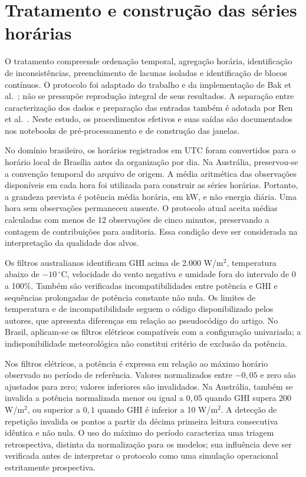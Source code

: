 \section{Tratamento e construção das séries horárias}
\label{sec:tratamento_bases}

O tratamento compreende ordenação temporal, agregação horária, identificação de inconsistências, preenchimento de lacunas isoladas e identificação de blocos contínuos. O protocolo foi adaptado do trabalho e da implementação de Bak et al.\ \cite{bak2025transfer}; não se pressupõe reprodução integral de seus resultados. A separação entre caracterização dos dados e preparação das entradas também é adotada por Ren et al.\ \cite{ren2024dctcn}. Neste estudo, os procedimentos efetivos e suas saídas são documentados nos notebooks de pré-processamento e de construção das janelas.

No domínio brasileiro, os horários registrados em UTC foram convertidos para o horário local de Brasília antes da organização por dia. Na Austrália, preservou-se a convenção temporal do arquivo de origem. A média aritmética das observações disponíveis em cada hora foi utilizada para construir as séries horárias. Portanto, a grandeza prevista é potência média horária, em kW, e não energia diária. Uma hora sem observações permaneceu ausente. O protocolo atual aceita médias calculadas com menos de 12 observações de cinco minutos, preservando a contagem de contribuições para auditoria. Essa condição deve ser considerada na interpretação da qualidade dos alvos.

Os filtros australianos identificam GHI acima de 2.000 W/m$^2$, temperatura abaixo de $-10\,^\circ$C, velocidade do vento negativa e umidade fora do intervalo de 0 a 100\%. Também são verificadas incompatibilidades entre potência e GHI e sequências prolongadas de potência constante não nula. Os limites de temperatura e de incompatibilidade seguem o código disponibilizado pelos autores, que apresenta diferenças em relação ao pseudocódigo do artigo. No Brasil, aplicam-se os filtros elétricos compatíveis com a configuração univariada; a indisponibilidade meteorológica não constitui critério de exclusão da potência.

Nos filtros elétricos, a potência é expressa em relação ao máximo horário observado no período de referência. Valores normalizados entre $-0{,}05$ e zero são ajustados para zero; valores inferiores são invalidados. Na Austrália, também se invalida a potência normalizada menor ou igual a $0{,}05$ quando GHI supera 200 W/m$^2$, ou superior a $0{,}1$ quando GHI é inferior a 10 W/m$^2$. A detecção de repetição invalida os pontos a partir da décima primeira leitura consecutiva idêntica e não nula. O uso do máximo do período caracteriza uma triagem retrospectiva, distinta da normalização para os modelos; sua influência deve ser verificada antes de interpretar o protocolo como uma simulação operacional estritamente prospectiva.

